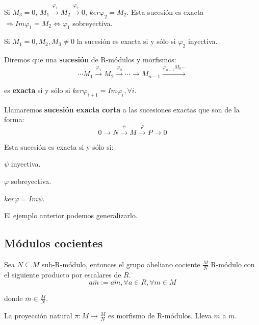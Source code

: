\begin{nota}
\begin{itemize*}
\item Si $M_3=0$, $M_1\xrightarrow{\varphi_1}M_2 \xrightarrow{\varphi_2} 0$, $ker \varphi_2=M_2$. Esta sucesión es exacta $\Rightarrow Im \varphi_1=M_2 \Leftrightarrow \varphi_1$ sobreyectiva. 
\item Si $M_1=0,M_2,M_3\neq 0$ la sucesión es exacta si y sólo si $\varphi_2$ inyectiva.
\end{itemize*}
\end{nota}

\begin{Def}
Diremos que una \textbf{sucesión} de R-módulos y morfismos:
$$\cdots M_1\xrightarrow{\varphi_1}M_2\xrightarrow{\varphi_2}\cdots \rightarrow M_{n-1}\xrightarrow{\varphi_{n-1}M_n \cdots} $$

es \textbf{exacta} si y sólo si $ker\varphi_{i+1}=Im \varphi_i, \forall i$. 
\end{Def}


\begin{Def}
Llamaremos \textbf{sucesión exacta corta} a las sucesiones exactas que son de la forma: 
$$0\rightarrow N \xrightarrow{\psi} M \xrightarrow{\varphi} P \rightarrow 0 $$
\end{Def}

\begin{nota}
Esta sucesión es exacta si y sólo si: 
\begin{itemize*}
\item $\psi$ inyectiva.
\item $\varphi$ sobreyectiva.
\item $ker\varphi = Im \psi$. 
\end{itemize*}

El ejemplo anterior podemos generalizarlo. 
\end{nota}

\subsection{Módulos cocientes}

Sea $N\subseteq M$ sub-R-módulo, entonces el grupo abeliano cociente $\frac{M}{N}$ R-módulo con el siguiente producto por escalares de $R$.
$$ a \bar{m} := \bar{am}, \forall a \in R, \forall m\in M $$

donde $\bar{m}\in \frac{M}{N}$.


La proyección natural $\pi : M \rightarrow \frac{M}{N}$ es morfismo de R-módulos. Lleva $m$ a $\bar{m}$.


